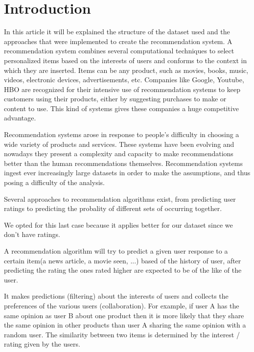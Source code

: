 \section{Introduction}
\label{intro}
In this article it will be explained the structure of the dataset used and the approaches that
were implemented to create the recommendation system.
A recommendation system combines several computational techniques to select personalized items based on the
interests of users and conforms to the context in which they are inserted.
Items can be any product, such as movies, books, music, videos, electronic devices, advertisements, etc.
Companies like Google, Youtube, HBO are recognized for their intensive use of recommendation systems to 
keep customers using their products, either by suggesting  purchases to make or content to use.
This kind of systems gives these companies a huge competitive advantage.

Recommendation systems arose in response to people's difficulty in choosing a wide variety of products and services.
These systems have been evolving and nowadays they present a complexity and capacity to make recommendations better
than the human recommendations themselves. Recommendation systems ingest ever increasingly large datasets in 
order to make the assumptions, and thus posing a difficulty of the analysis.

Several approaches to recommendation algorithms exist, from predicting user ratings to predicting the probality
of different sets of occurring together.

We opted for this last case because it applies better for our dataset since we don't have ratings. 


A recommendation algorithm will try to predict a given user response to a certain item(a news article, a movie seen, ...)
based of the history of user, after predicting the rating the ones rated higher are expected to be of the like
of the user.

It makes predictions (filtering) about the interests of users and collects the preferences of the various users (collaboration).
For example, if user A has the same opinion as user B about one product then it is more likely that they share
the same opinion in other products than user A sharing the same opinion with a random user.
The similarity between two items is determined by the interest / rating given by the users.